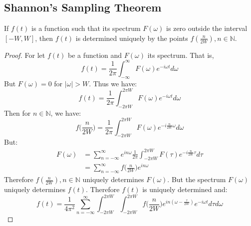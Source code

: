 \documentclass[crop=false,class=book,oneside]{standalone}
\begin{document}
        \subsection{Shannon's Sampling Theorem}
            \begin{theorem}
            If $f(t)$ is a function such that its spectrum $F(\omega)$ is zero outside the interval $[-W,W]$, then $f(t)$ is determined uniquely by the points $f(\frac{n}{2W}), n\in \mathbb{N}$.
            \end{theorem}
            \begin{proof}
            For let $f(t)$ be a function and $F(\omega)$ its spectrum. That is,
            \begin{equation*}
            f(t) = \frac{1}{2\pi}\int_{-\infty}^{\infty} F(\omega)e^{-i\omega t}d\omega
            \end{equation*}
            But $F(\omega) = 0$ for $|\omega| > W$. Thus we have:
            \begin{equation*}
            f(t) = \frac{1}{2\pi}\int_{-2\pi W}^{2\pi W}F(\omega)e^{-i\omega t}d\omega
            \end{equation*}
            Then for $n\in \mathbb{N}$, we have:
            \begin{equation*}
            f\big(\frac{n}{2W}\big) = \frac{1}{2\pi}\int_{-2\pi W}^{2\pi W}F(\omega) e^{-i\frac{n}{2W}\omega}d\omega
            \end{equation*}
            But:
            \begin{align*}
            F(\omega) &= \sum_{n=-\infty}^{\infty}e^{in\omega}\frac{1}{2\pi}\int_{-2\pi W}^{2\pi W}F(\tau)e^{-i\frac{n}{2W}\tau}d\tau\\
            &= \sum_{n=-\infty}^{\infty}f\big(\frac{n}{2W}\big)e^{in\omega}
            \end{align*}
            Therefore $f(\frac{n}{2W}), n\in \mathbb{N}$ uniquely determines $F(\omega)$. But the spectrum $F(\omega)$ uniquely determines $f(t)$. Therefore $f(t)$ is uniquely determined and:
            \begin{equation*}
            f(t) = \frac{1}{4\pi^2}\sum_{n=-\infty}^{\infty}\int_{-2\pi W}^{2\pi W}\int_{-2\pi W}^{2\pi W}f\big(\frac{n}{2W}\big)e^{in(\omega-\frac{\tau}{2W})}e^{-i\omega t}d\tau d\omega
            \end{equation*}
            
            \end{proof}
\end{document}
